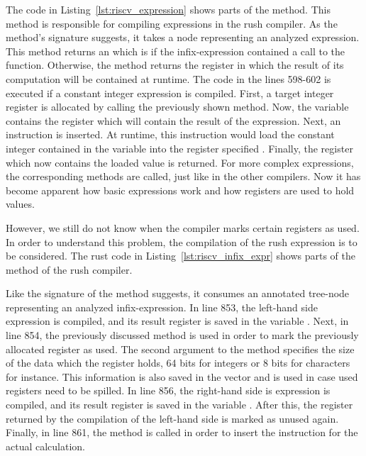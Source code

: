 
The code in Listing~\ref{lst:riscv_expression} shows parts of the  method.
This method is responsible for compiling expressions in the \riscv{} rush compiler.
As the method's signature suggests, it takes a node representing an analyzed expression.
This method returns an  which is  if the infix-expression contained a call to the  function.
Otherwise, the method returns the register in which the result of its computation will be contained at runtime.
The code in the lines 598-602 is executed if a constant integer expression is compiled.
First, a target integer register is allocated by calling the previously shown  method.
Now, the  variable contains the register which will contain the result of the expression.
Next, an  instruction is inserted.
At runtime, this instruction would load the constant integer contained in the variable  into the register specified .
Finally, the register which now contains the loaded value is returned.
For more complex expressions, the corresponding methods are called, just like in the other compilers.
Now it has become apparent how basic expressions work and how registers are used to hold values.

However, we still do not know when the compiler marks certain registers as used.
In order to understand this problem, the compilation of the rush expression  is to be considered.
The rust code in Listing~\ref{lst:riscv_infix_expr} shows parts of the  method of the rush compiler.


Like the signature of the method suggests, it consumes an annotated tree-node representing an analyzed infix-expression.
In line 853, the left-hand side expression is compiled, and its result register is saved in the variable .
Next, in line 854, the previously discussed  method is used in order to mark the previously allocated register as used.
The second argument to the method specifies the size of the data which the register holds, 64 bits for integers or 8 bits for characters for instance.
This information is also saved in the  vector and is used in case used registers need to be spilled.
In line 856, the right-hand side is expression is compiled, and its result register is saved in the variable .
After this, the register returned by the compilation of the left-hand side is marked as unused again.
Finally, in line 861, the  method is called in order to insert the instruction for the actual calculation.

